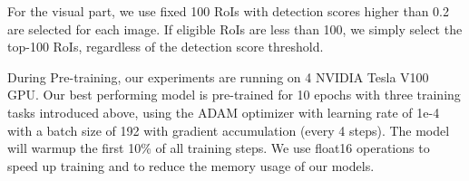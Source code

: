\documentclass[letterpaper]{article} \usepackage{aaai20}  \usepackage{times}  \usepackage{helvet} \usepackage{courier}  \usepackage[hyphens]{url}  \usepackage{graphicx} \urlstyle{rm} \def\UrlFont{\rm}  \usepackage{graphicx}  \frenchspacing  \setlength{\pdfpagewidth}{8.5in}  \setlength{\pdfpageheight}{11in}  \usepackage{amssymb}
\begin{document}
For the visual part, we use fixed 100 RoIs with detection scores higher
than 0.2 are selected for each image. If eligible RoIs are less than 100, we simply select the top-100 RoIs, regardless of the detection score threshold.

During Pre-training, our experiments are running on 4 NVIDIA Tesla V100 GPU. Our best performing model is pre-trained for 10 epochs with three training tasks introduced above, using the ADAM optimizer with learning rate of 1e-4 with a batch size of 192 with gradient accumulation (every 4 steps). The model will warmup the first 10\% of all training steps. We use float16 operations to speed up training and to reduce the memory usage of our models. 

\begin{table*}[!htbp]
\end{table*}
\end{document}
